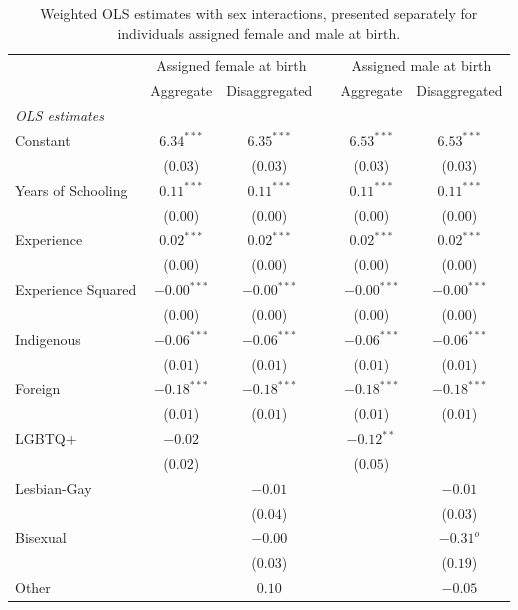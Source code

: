 \begin{table}[H]
\begin{center}
\begin{threeparttable}
\captionsetup{margin=0.5cm}
\caption{Weighted OLS estimates with sex interactions, presented separately for individuals assigned female and male at birth.}
\label{tab:MCO_CASEN_4cols}
\footnotesize
\centering
\begin{tabular}{lccccc}
\toprule
 & \multicolumn{2}{c}{Assigned female at birth} & & \multicolumn{2}{c}{Assigned male at birth} \\ 
 & Aggregate & Disaggregated & & Aggregate & Disaggregated \\ \midrule
\textit{OLS estimates} &  & &  &  &  \\ 
Constant & $6.34^{***}$& $6.35^{***}$ & & $6.53^{***}$& $6.53^{***}$ \\ 
 & ($0.03$)& ($0.03$) & & ($0.03$)& ($0.03$) \\ 
Years of Schooling & $0.11^{***}$& $0.11^{***}$ & & $0.11^{***}$& $0.11^{***}$ \\ 
 & ($0.00$)& ($0.00$) & & ($0.00$)& ($0.00$) \\ 
Experience & $0.02^{***}$& $0.02^{***}$ & & $0.02^{***}$& $0.02^{***}$ \\ 
 & ($0.00$)& ($0.00$) & & ($0.00$)& ($0.00$) \\ 
Experience Squared & $-0.00^{***}$& $-0.00^{***}$ & & $-0.00^{***}$& $-0.00^{***}$ \\ 
 & ($0.00$)& ($0.00$) & & ($0.00$)& ($0.00$) \\ 
Indigenous & $-0.06^{***}$& $-0.06^{***}$ & & $-0.06^{***}$& $-0.06^{***}$ \\ 
 & ($0.01$)& ($0.01$) & & ($0.01$)& ($0.01$) \\ 
Foreign & $-0.18^{***}$& $-0.18^{***}$ & & $-0.18^{***}$& $-0.18^{***}$ \\ 
 & ($0.01$)& ($0.01$) & & ($0.01$)& ($0.01$) \\ 
LGBTQ+ & $-0.02$&  & & $-0.12^{**}$&  \\ 
 & ($0.02$)&  & & ($0.05$)&  \\ 
Lesbian-Gay & & $-0.01$ & & & $-0.01$ \\ 
 & & ($0.04$) & & & ($0.03$) \\ 
Bisexual & & $-0.00$ & & & $-0.31^{o}$ \\ 
 & & ($0.03$) & & & ($0.19$) \\ 
Other & & $0.10$ & & & $-0.05$ \\ 

\end{tabular}
\end{threeparttable}
\end{center}
\end{table}
